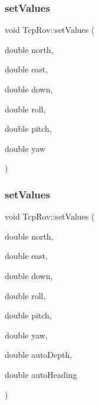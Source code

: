 \mbox{\label{class_tcp_rov_a01029567d86810a512a6dd8a0349bfec}} 
\subsubsection{\texorpdfstring{set\+Values}{setValues}\hspace{0.1cm}{\footnotesize\ttfamily [2/3]}}
{\footnotesize\ttfamily void Tcp\+Rov\+::set\+Values (\begin{DoxyParamCaption}\item[{double}]{north,  }\item[{double}]{east,  }\item[{double}]{down,  }\item[{double}]{roll,  }\item[{double}]{pitch,  }\item[{double}]{yaw }\end{DoxyParamCaption})\hspace{0.3cm}{\ttfamily [slot]}}

\mbox{\label{class_tcp_rov_a02c824d8ad2ce77e8d1a4ea7bc1fd9fe}} 
\subsubsection{\texorpdfstring{set\+Values}{setValues}\hspace{0.1cm}{\footnotesize\ttfamily [3/3]}}
{\footnotesize\ttfamily void Tcp\+Rov\+::set\+Values (\begin{DoxyParamCaption}\item[{double}]{north,  }\item[{double}]{east,  }\item[{double}]{down,  }\item[{double}]{roll,  }\item[{double}]{pitch,  }\item[{double}]{yaw,  }\item[{double}]{auto\+Depth,  }\item[{double}]{auto\+Heading }\end{DoxyParamCaption})\hspace{0.3cm}{\ttfamily [slot]}}

\mbox{\label{class_tcp_rov_aa5e739ff2a64a009bbd518eae6f226b0}} 

